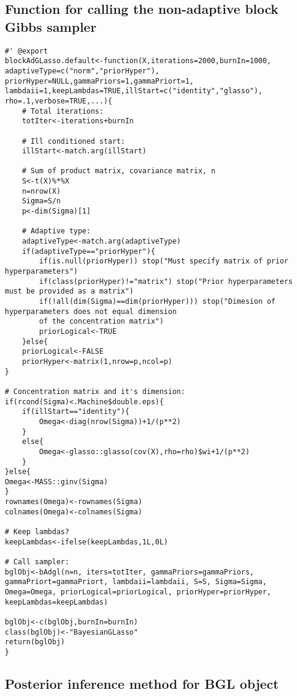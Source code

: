 \subsection{Function for calling the non-adaptive block Gibbs sampler}
\begin{lstlisting}
#' @export
blockAdGLasso.default<-function(X,iterations=2000,burnIn=1000, adaptiveType=c("norm","priorHyper"),
priorHyper=NULL,gammaPriors=1,gammaPriort=1,
lambdaii=1,keepLambdas=TRUE,illStart=c("identity","glasso"),
rho=.1,verbose=TRUE,...){
	# Total iterations:
	totIter<-iterations+burnIn
	
	# Ill conditioned start:
	illStart<-match.arg(illStart)
	
	# Sum of product matrix, covariance matrix, n
	S<-t(X)%*%X
	n=nrow(X)
	Sigma=S/n
	p<-dim(Sigma)[1]
	
	# Adaptive type:
	adaptiveType<-match.arg(adaptiveType)
	if(adaptiveType=="priorHyper"){
		if(is.null(priorHyper)) stop("Must specify matrix of prior hyperparameters")
		if(class(priorHyper)!="matrix") stop("Prior hyperparameters must be provided as a matrix")
		if(!all(dim(Sigma)==dim(priorHyper))) stop("Dimesion of hyperparameters does not equal dimension
		of the concentration matrix")
		priorLogical<-TRUE
	}else{
	priorLogical<-FALSE
	priorHyper<-matrix(1,nrow=p,ncol=p)
}

# Concentration matrix and it's dimension:
if(rcond(Sigma)<.Machine$double.eps){
	if(illStart=="identity"){
		Omega<-diag(nrow(Sigma))+1/(p**2)
	}
	else{
		Omega<-glasso::glasso(cov(X),rho=rho)$wi+1/(p**2)
	}
}else{
Omega<-MASS::ginv(Sigma)
}
rownames(Omega)<-rownames(Sigma)
colnames(Omega)<-colnames(Sigma)

# Keep lambdas?
keepLambdas<-ifelse(keepLambdas,1L,0L)

# Call sampler:
bglObj<-bAdgl(n=n, iters=totIter, gammaPriors=gammaPriors,
gammaPriort=gammaPriort, lambdaii=lambdaii, S=S, Sigma=Sigma,
Omega=Omega, priorLogical=priorLogical, priorHyper=priorHyper,
keepLambdas=keepLambdas)

bglObj<-c(bglObj,burnIn=burnIn)
class(bglObj)<-"BayesianGLasso"
return(bglObj)
}

\end{lstlisting}

\subsection{Posterior inference method for BGL object}


